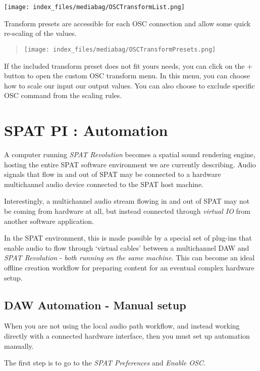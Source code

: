 \documentclass[
  letterpaper,
  DIV=11,
  numbers=noendperiod]{scrreport}
\begin{document}
\texttt{[image: index\_files/mediabag/OSCTransformList.png]}

Transform presets are accessible for each OSC connection and allow some
quick re-scaling of the values.

\begin{quote}
\texttt{[image: index\_files/mediabag/OSCTransformPresets.png]}
\end{quote}

If the included transform preset does not fit yours needs, you can click
on the + button to open the custom OSC transform menu. In this menu, you
can choose how to scale our input our output values. You can also choose
to exclude specific OSC command from the scaling rules.

\hypertarget{spat-pi-automation}{%
\chapter{SPAT PI : Automation}\label{spat-pi-automation}}

A computer running \emph{SPAT Revolution} becomes a spatial sound
rendering engine, hosting the entire SPAT software environment we are
currently describing. Audio signals that flow in and out of SPAT may be
connected to a hardware multichannel audio device connected to the SPAT
host machine.

Interestingly, a multichannel audio stream flowing in and out of SPAT
may not be coming from hardware at all, but instead connected through
\emph{virtual IO} from another software application.

In the SPAT environment, this is made possible by a special set of
plug-ins that enable audio to flow through `virtual cables' between a
multichannel DAW and \emph{SPAT Revolution} - \emph{both running on the
same machine}. This can become an ideal offline creation workflow for
preparing content for an eventual complex hardware setup.

\hypertarget{daw-automation---manual-setup}{%
\section{DAW Automation - Manual
setup}\label{daw-automation---manual-setup}}

When you are not using the local audio path workflow, and instead
working directly with a connected hardware interface, then you must set
up automation manually.

The first step is to go to the \emph{SPAT Preferences} and \emph{Enable
OSC}.
\end{document}
